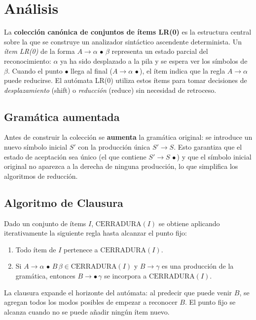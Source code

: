 \section{Análisis}

La \textbf{colección canónica de conjuntos de ítems LR(0)} es la estructura central sobre la
que se construye un analizador sintáctico ascendente determinista. Un \textit{ítem LR(0)} de
la forma $A \to \alpha\,\bullet\,\beta$ representa un estado parcial del reconocimiento:
$\alpha$ ya ha sido desplazado a la pila y se espera ver los símbolos de $\beta$. Cuando el
punto $\bullet$ llega al final ($A \to \alpha\,\bullet$), el ítem indica que la regla
$A \to \alpha$ puede reducirse. El autómata LR(0) utiliza estos ítems para tomar decisiones
de \textit{desplazamiento} (shift) o \textit{reducción} (reduce) sin necesidad de retroceso.

\subsection*{Gramática aumentada}

Antes de construir la colección se \textbf{aumenta} la gramática original: se introduce un
nuevo símbolo inicial $S'$ con la producción única $S' \to S$. Esto garantiza que el estado
de aceptación sea único (el que contiene $S' \to S\,\bullet$) y que el símbolo inicial
original no aparezca a la derecha de ninguna producción, lo que simplifica los algoritmos
de reducción.

\subsection*{Algoritmo de Clausura}

Dado un conjunto de ítems $I$, $\mathrm{CERRADURA}(I)$ se obtiene aplicando iterativamente
la siguiente regla hasta alcanzar el punto fijo:

\begin{enumerate}
  \item Todo ítem de $I$ pertenece a $\mathrm{CERRADURA}(I)$.
  \item Si $A \to \alpha\,\bullet\,B\,\beta \in \mathrm{CERRADURA}(I)$ y
        $B \to \gamma$ es una producción de la gramática,
        entonces $B \to \bullet\,\gamma$ se incorpora a $\mathrm{CERRADURA}(I)$.
\end{enumerate}

La clausura expande el horizonte del autómata: al predecir que puede venir $B$, se agregan
todos los modos posibles de empezar a reconocer $B$. El punto fijo se alcanza cuando no se
puede añadir ningún ítem nuevo.

